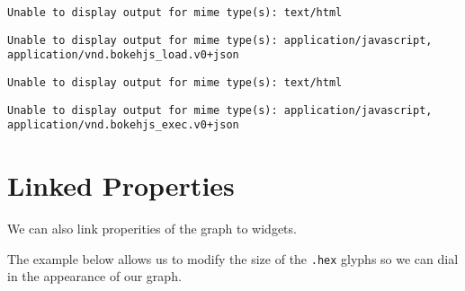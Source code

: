 \documentclass[
  letterpaper,
  DIV=11,
  numbers=noendperiod]{scrreprt}
\begin{document}
\begin{verbatim}
Unable to display output for mime type(s): text/html
\end{verbatim}

\begin{verbatim}
Unable to display output for mime type(s): application/javascript, application/vnd.bokehjs_load.v0+json
\end{verbatim}

\begin{verbatim}
Unable to display output for mime type(s): text/html
\end{verbatim}

\begin{verbatim}
Unable to display output for mime type(s): application/javascript, application/vnd.bokehjs_exec.v0+json
\end{verbatim}

\hypertarget{linked-properties}{%
\section{Linked Properties}\label{linked-properties}}

We can also link properities of the graph to widgets.

The example below allows us to modify the size of the \texttt{.hex}
glyphs so we can dial in the appearance of our graph.
\end{document}
